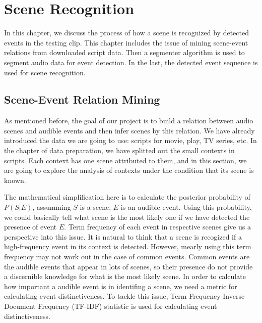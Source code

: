 \chapter{Scene Recognition}
In this chapter, we discuss the process of how a scene is recognized by detected events in the testing clip. 
This chapter includes the issue of mining scene-event relations from downloaded script data.
Then a segmenter algorithm is used to segment audio data for event detection. 
In the last, the detected event sequence is used for scene recognition. 

\section{Scene-Event Relation Mining}
As mentioned before, the goal of our project is to build a relation between audio scenes and audible events and then infer scenes by this relation.  
We have already introduced the data we are going to use: scripts for movie, play, TV series, etc. 
In the chapter of data preparation, we have splitted out the small contexts in scripts. 
Each context has one scene attributed to them, and in this section, we are going to explore the analysis of contexts under the condition that its scene is known. 

The mathematical simplification here is to calculate the posterior probability of $P(S|E)$, assumming $S$ is a scene, $E$ is an audible event. 
Using this probability, we could basically tell what scene is the most likely one if we have detected the presence of event $E$. 
Term frequency of each event in respective scenes give us a perspective into this issue. 
It is natural to think that a scene is recogized if a high-frequency event in its context is detected. 
However, mearly using this term frequency may not work out in the case of common events. 
Common events are the audible events that appear in lots of scenes, so their presence do not provide a discernible knowledge for what is the most likely scene. 
In order to calculate how important a audible event is in identifing a scene, we need a metric for calculating event distinctiveness. 
To tackle this issue, Term Frequency-Inverse Document Frequency (TF-IDF) statistic is used for calculating event distinctiveness. 

